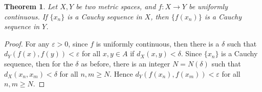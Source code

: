 \documentclass[11pt]{book}
\newtheorem{theorem}{Theorem}[chapter]
\theoremstyle{definition}
\numberwithin{equation}{chapter}
\begin{document}
\medskip

\begin{theorem}\label{th_315_added}
Let $X,Y$ be two metric spaces, and $f: X \to Y$ be uniformly continuous. If $\{x_n\}$ is a Cauchy sequence in $X$, then $\{f(x_n)\}$ is a Cauchy sequence in $Y$.
\end{theorem}
\begin{proof}
For any $\varepsilon > 0$, since $f$ is uniformly continuous, then there is a $\delta$ such that $d_Y(f(x), f(y)) < \varepsilon$ for all $x,y \in A$ if $d_X(x,y) < \delta$. Since $\{x_n\}$ is a Cauchy sequence, then for the $\delta$ as before, there is an integer $N = N(\delta)$ such that $d_X(x_n, x_m) < \delta$ for all $n,m \geq N$. Hence $d_Y(f(x_n),f(x_m)) < \varepsilon$ for all $n, m \geq N$.
\end{proof}

\medskip
\end{document}
